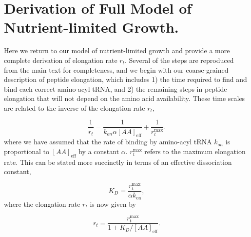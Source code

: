 
\section{Derivation of Full Model of Nutrient-limited Growth.}
\label{sec:SI_model}

Here we return to our model of nutrient-limited growth and provide a more complete derivation of elongation rate $r_t$. Several of the steps are reproduced from the main text for completeness, and we begin with our coarse-grained description of peptide elongation, which includes 1) the time required to find and bind each
correct amino-acyl tRNA, and 2) the remaining steps in peptide elongation that
will not depend on the amino acid availability. These time scales are related to the inverse of the elongation rate $r_t$,

\begin{equation}
\frac{1}{r_t} = \frac{1}{k_{on} \alpha [AA]_{\text{eff}}} + \frac{1}{r_{t}^{\text{max}}}.
\end{equation}
where we have assumed that the rate of binding by amino-acyl tRNA $k_{on}$ is
proportional to $[AA]_{\text{eff}}$ by a constant $\alpha$. $r_{t}^{\text{max}}$
refers to the maximum elongation rate. This can be stated more
succinctly in terms of an effective dissociation constant,

\begin{equation}
    K_D = \frac{r_{t}^{\text{max}}}{\alpha k_\text{on}},
\end{equation}
where the elongation rate $r_t$ is now given by

\begin{equation}
r_t = \frac{r_{t}^{\text{max}}}{1 + K_D/[AA]_{\text{eff}}}.
\label{eq:rt_kd_simple}
\end{equation}

